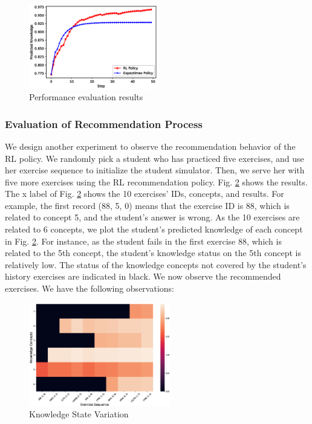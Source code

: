 \documentclass{edm_template}
\begin{document}
\begin{figure}
\includegraphics[width=0.5\textwidth]{predicted_knowledge.eps}
\caption{Performance evaluation results}
\label{compare}
\end{figure}

\subsubsection{Evaluation of Recommendation Process}

We design another experiment to observe the recommendation behavior of the RL policy. We randomly pick a student who has practiced five exercises, and use her exercise sequence to initialize the student simulator. Then, we serve her with five more exercises using the RL recommendation policy. Fig. \ref{recom} shows the results. The x label of Fig. \ref{recom} shows the 10 exercises' IDs, concepts, and results. For example, the first record (88, 5, 0) means that the exercise ID is 88, which is related to concept 5, and the student's answer is wrong. As the 10 exercises are related to 6 concepts, we plot the student's predicted knowledge of each concept in Fig. \ref{recom}. For instance, as the student fails in the first exercise 88, which is related to the 5th concept, the student's knowledge status on the 5th concept is relatively low. The status of the knowledge concepts not covered by the student's history exercises are indicated in black. We now observe the recommended exercises. We have the following observations:

\begin{figure}
\includegraphics[width=0.55\textwidth]{recom1.eps}
\caption{Knowledge State Variation}
\label{recom}
\end{figure}
\end{document}
